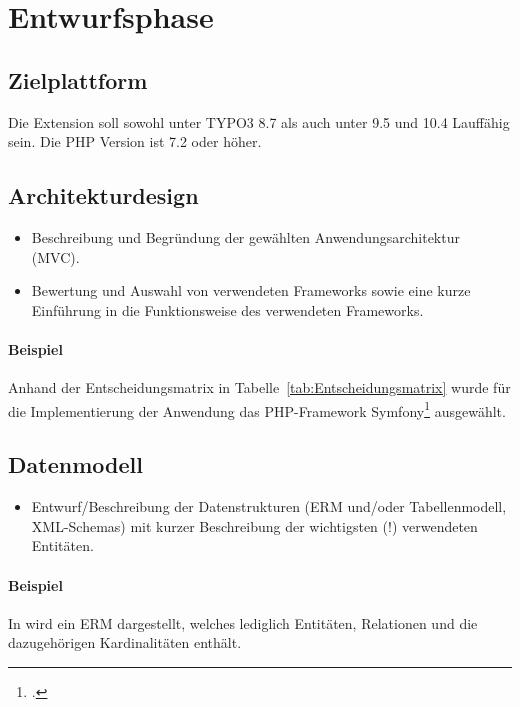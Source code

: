 \section{Entwurfsphase} 
\label{sec:Entwurfsphase}

\subsection{Zielplattform}
\label{sec:Zielplattform}

Die Extension soll sowohl unter TYPO3 8.7 als auch unter 9.5 und 10.4 Lauffähig sein. Die PHP Version ist 7.2 oder höher.


\subsection{Architekturdesign}
\label{sec:Architekturdesign}
\begin{itemize}
	\item Beschreibung und Begründung der gewählten Anwendungsarchitektur (\zB \acs{MVC}).
	\item \Ggfs Bewertung und Auswahl von verwendeten Frameworks sowie \ggfs eine kurze Einführung in die Funktionsweise des verwendeten Frameworks.
\end{itemize}

\paragraph{Beispiel}
Anhand der Entscheidungsmatrix in Tabelle~\ref{tab:Entscheidungsmatrix} wurde für die Implementierung der Anwendung das \acs{PHP}-Framework Symfony\footnote{\Vgl \citet{Symfony}.} ausgewählt. 



\subsection{Datenmodell}
\label{sec:Datenmodell}

\begin{itemize}
	\item Entwurf/Beschreibung der Datenstrukturen (\zB \acs{ERM} und/oder Tabellenmodell, \acs{XML}-Schemas) mit kurzer Beschreibung der wichtigsten (!) verwendeten Entitäten.
\end{itemize}

\paragraph{Beispiel}
In  wird ein \ac{ERM} dargestellt, welches lediglich Entitäten, Relationen und die dazugehörigen Kardinalitäten enthält. 

